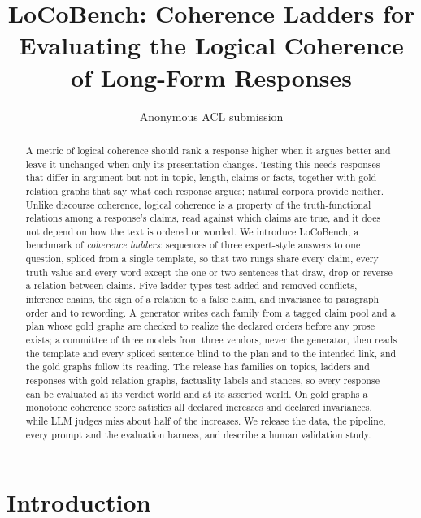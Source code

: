 \documentclass[11pt]{article}
\title{LoCoBench: Coherence Ladders for Evaluating the Logical Coherence\\ of Long-Form Responses}
\author{Anonymous ACL submission}
\begin{document}
\maketitle

\begin{abstract}
A metric of logical coherence should rank a response higher when it argues better and leave it
unchanged when only its presentation changes. Testing this needs responses that differ in
argument but not in topic, length, claims or facts, together with gold relation graphs that say
what each response argues; natural corpora provide neither. Unlike discourse coherence, logical
coherence is a property of the truth-functional relations among a response's claims, read against
which claims are true, and it does not depend on how the text is ordered or worded. We introduce LoCoBench, a benchmark of
\emph{coherence ladders}: sequences of three expert-style answers to one question, spliced from a
single template, so that two rungs share every claim, every truth value and every word except the
one or two sentences that draw, drop or reverse a relation between claims. Five ladder types test
added and removed conflicts, inference chains, the sign of a relation to a false claim, and
invariance to paragraph order and to rewording. A generator writes each family from a tagged claim
pool and a plan whose gold graphs are checked to realize the declared orders before any prose
exists; a committee of three models from three vendors, never the generator, then reads the
template and every spliced sentence blind to the plan and to the intended link, and the gold
graphs follow its reading. The release has \lbFamilies{} families on \lbTopics{} topics,
\lbLadders{} ladders and \lbItems{} responses with gold relation graphs, factuality labels and
stances, so every response can be evaluated at its verdict world and at its asserted world. On
gold graphs a monotone coherence score satisfies all \sThreeNIncPairs{} declared increases and
\sThreeNInvPairs{} declared invariances, while LLM judges miss about half of the increases. We
release the data, the pipeline, every prompt and the evaluation harness, and describe a human
validation study.
\end{abstract}

\section{Introduction}
\label{sec:intro}
\end{document}
